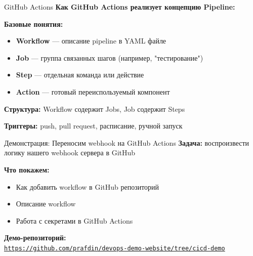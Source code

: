 \documentclass[aspectratio=169]{beamer}
\begin{document}
    \begin{frame}{GitHub Actions}
        \textbf{Как GitHub Actions реализует концепцию Pipeline:}
        
        \vspace{0.5cm}
        
        \textbf{Базовые понятия:}
        \begin{itemize}
            \item \textbf{Workflow} — описание pipeline в YAML файле
            \item \textbf{Job} — группа связанных шагов (например, "тестирование")
            \item \textbf{Step} — отдельная команда или действие
            \item \textbf{Action} — готовый переиспользуемый компонент
        \end{itemize}
        
        \vspace{0.5cm}
        
        \textbf{Структура:} Workflow содержит Jobs, Job содержит Steps
        
        \vspace{0.3cm}
        
        \textbf{Триггеры:} push, pull request, расписание, ручной запуск
    \end{frame}

    \begin{frame}{Демонстрация: Переносим webhook на GitHub Actions}
        \textbf{Задача:} воспроизвести логику нашего webhook сервера в GitHub

        
        \vspace{0.3cm}
        
        \textbf{Что покажем:}
        \begin{itemize}
            \item Как добавить workflow в GitHub репозиторий
            \item Описание workflow
            \item Работа с секретами в GitHub Actions
        \end{itemize}

        \vspace{0.2cm}
        \textbf{Демо-репозиторий:} \\
        \href{https://github.com/prafdin/devops-demo-website/tree/cicd-demo}{\texttt{https://github.com/prafdin/devops-demo-website/tree/cicd-demo}}
    \end{frame}
\end{document}
